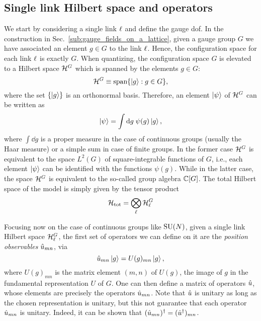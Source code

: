 \subsection{Single link Hilbert space and operators}
\label{sub:single_link_hilbert_space_and_operators}

We start by considering a single link $\ell$ and define the gauge \ac{dof}.
In  the construction in Sec.~\ref{sub:gauge_fields_on_a_lattice}, given a gauge group $G$ we have associated an element $g \in G$ to the link $\ell$.
Hence, the configuration space for each link $\ell$ is exactly $G$.
When quantizing, the configuration space $G$ is elevated to a Hilbert space $\mathcal{H}^G$ which is spanned by the elements $g \in G$:
\begin{equation}
    \mathcal{H}^G \equiv \text{span}\{\ket{g} : g \in G\},
    \label{eq:single_link_Hilbert_space}
\end{equation}
where the set $\{\ket{g}\}$ is an orthonormal basis.
Therefore, an element $\ket{\psi}$ of $\mathcal{H}^G$ can be written as
\begin{equation}
    \ket{\psi} = \int \dd g \; \psi(g) \ket{g},
\end{equation}
where $\int \dd g$ is a proper measure in the case of continuous groups (usually the Haar measure) or a simple sum in case of finite groups.
In the former case $\mathcal{H}^G$ is equivalent to the space $L^2(G)$ of square-integrable functions of $G$, i.e., each element $\ket{\psi}$ can be identified with the functions $\psi(g)$.
While in the latter case, the space $\mathcal{H}^G$ is equivalent to the so-called group algebra $\mathbb{C}[G]$.
The total Hilbert space of the model is simply given by the tensor product
\begin{equation}
    \mathcal{H}_{\text{tot}} = \bigotimes_{\ell} \mathcal{H}^G_{\ell}
\end{equation}


Focusing now on the case of continuous groups like $\text{SU}(N)$,
given a single link Hilbert space $\mathcal{H}^G_{\ell}$, the first set of operators we can define on it are the \emph{position observables} $\hat{u}_{mn}$, via
\begin{equation}
    \hat{u}_{mn} \ket{g} = U(g)_{mn} \ket{g},
\end{equation}
where $U(g)_{mn}$ is the matrix element $(m, n)$ of $U(g)$, the image of $g$ in the fundamental representation $U$ of $G$.
One can then define a matrix of operators $\hat{u}$, whose elements are precisely the operators $\hat{u}_{mn}$.
Note that $\hat{u}$ is unitary as long as the chosen representation is unitary, but this not guarantee that each operator $\hat{u}_{mn}$ is unitary.
Indeed, it can be shown that $(\hat{u}_{mn})^{\dagger} = (\hat{u}^{\dagger})_{mn}$.

